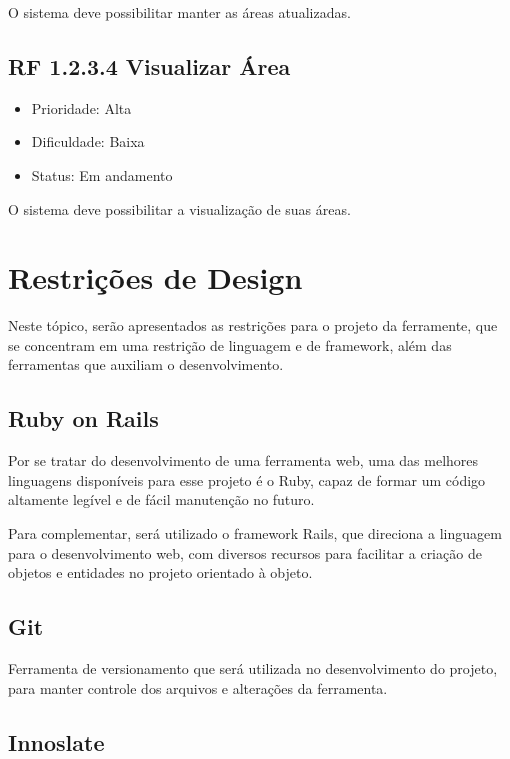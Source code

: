 O sistema deve possibilitar manter as áreas atualizadas.


\subsection{RF 1.2.3.4 Visualizar Área}

\begin{itemize}
  \item{Prioridade: Alta}
  \item{Dificuldade: Baixa}
  \item{Status: Em andamento}
\end{itemize}

O sistema deve possibilitar a visualização de suas áreas.



\section{Restrições de Design}

Neste tópico, serão apresentados as restrições para o projeto da ferramente, que se concentram em uma restrição de linguagem e de framework, além das ferramentas que auxiliam o desenvolvimento.

\subsection{Ruby on Rails}

Por se tratar do desenvolvimento de uma ferramenta web, uma das melhores linguagens disponíveis para esse projeto é o Ruby, capaz de formar um código altamente legível e de fácil manutenção no futuro.

Para complementar, será utilizado o framework Rails, que direciona a linguagem para o desenvolvimento web, com diversos recursos para facilitar a criação de objetos e entidades no projeto orientado à objeto.

\subsection{Git}

Ferramenta de versionamento que será utilizada no desenvolvimento do projeto, para manter controle dos arquivos e alterações da ferramenta.


\subsection{Innoslate}

